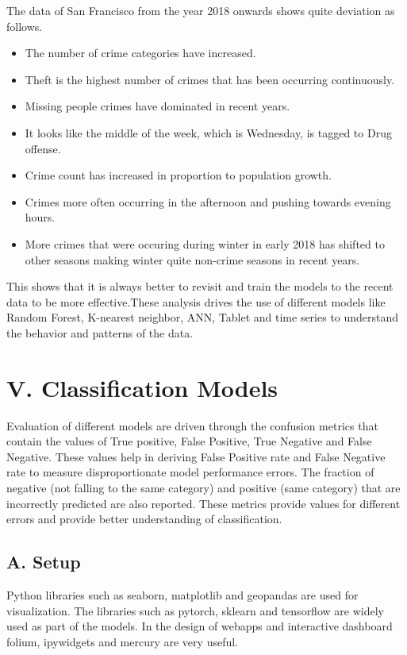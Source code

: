 \documentclass[conference,final, 10pt]{IEEEtran}
\providecommand{\tightlist}{%
  \setlength{\itemsep}{0pt}\setlength{\parskip}{0pt}}
\begin{document}
The data of San Francisco from the year 2018 onwards shows quite
deviation as follows.

\begin{itemize}
\tightlist
\item
  The number of crime categories have increased.
\item
  Theft is the highest number of crimes that has been occurring
  continuously.
\item
  Missing people crimes have dominated in recent years.
\item
  It looks like the middle of the week, which is Wednesday, is tagged to
  Drug offense.
\item
  Crime count has increased in proportion to population growth.
\item
  Crimes more often occurring in the afternoon and pushing towards
  evening hours.
\item
  More crimes that were occuring during winter in early 2018 has shifted
  to other seasons making winter quite non-crime seasons in recent
  years.
\end{itemize}

This shows that it is always better to revisit and train the models to
the recent data to be more effective.These analysis drives the use of
different models like Random Forest, K-nearest neighbor, ANN, Tablet and
time series to understand the behavior and patterns of the data.

\section{V. Classification Models}\label{v.-classification-models}

Evaluation of different models are driven through the confusion metrics
that contain the values of True positive, False Positive, True Negative
and False Negative. These values help in deriving False Positive rate
and False Negative rate to measure disproportionate model performance
errors. The fraction of negative (not falling to the same category) and
positive (same category) that are incorrectly predicted are also
reported. These metrics provide values for different errors and provide
better understanding of classification.

\subsection{A. Setup}\label{a.-setup}

Python libraries such as seaborn, matplotlib and geopandas are used for
visualization. The libraries such as pytorch, sklearn and tensorflow are
widely used as part of the models. In the design of webapps and
interactive dashboard folium, ipywidgets and mercury are very useful.
\end{document}
